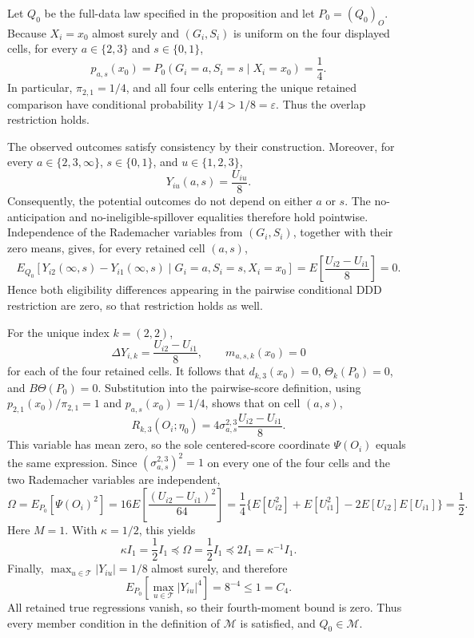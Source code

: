 Let \(Q_0\) be the full-data law specified in the proposition and let \(P_0=(Q_0)_O\).  Because \(X_i=x_0\) almost surely and \((G_i,S_i)\) is uniform on the four displayed cells, for every \(a\in\{2,3\}\) and \(s\in\{0,1\}\),
\[
p_{a,s}(x_0)=P_0(G_i=a,S_i=s\mid X_i=x_0)=\frac14.
\]
In particular, \(\pi_{2,1}=1/4\), and all four cells entering the unique retained comparison have conditional probability \(1/4>1/8=\varepsilon\).  Thus the overlap restriction holds.

The observed outcomes satisfy consistency by their construction.  Moreover, for every \(a\in\{2,3,\infty\}\), \(s\in\{0,1\}\), and \(u\in\{1,2,3\}\),
\[
Y_{iu}(a,s)=\frac{U_{iu}}8.
\]
Consequently, the potential outcomes do not depend on either \(a\) or \(s\).  The no-anticipation and no-ineligible-spillover equalities therefore hold pointwise.  Independence of the Rademacher variables from \((G_i,S_i)\), together with their zero means, gives, for every retained cell \((a,s)\),
\[
E_{Q_0}\!\left[Y_{i2}(\infty,s)-Y_{i1}(\infty,s)\mid G_i=a,S_i=s,X_i=x_0\right]
=E\!\left[\frac{U_{i2}-U_{i1}}8\right]=0.
\]
Hence both eligibility differences appearing in the pairwise conditional DDD restriction are zero, so that restriction holds as well.

For the unique index \(k=(2,2)\),
\[
\Delta Y_{i,k}=\frac{U_{i2}-U_{i1}}8,
\qquad
m_{a,s,k}(x_0)=0
\]
for each of the four retained cells.  It follows that \(d_{k,3}(x_0)=0\), \(\Theta_k(P_0)=0\), and \(B\Theta(P_0)=0\).  Substitution into the pairwise-score definition, using \(p_{2,1}(x_0)/\pi_{2,1}=1\) and \(p_{a,s}(x_0)=1/4\), shows that on cell \((a,s)\),
\[
R_{k,3}(O_i;\eta_0)
=4\sigma_{a,s}^{2,3}\frac{U_{i2}-U_{i1}}8.
\]
This variable has mean zero, so the sole centered-score coordinate \(\Psi(O_i)\) equals the same expression.  Since \((\sigma_{a,s}^{2,3})^2=1\) on every one of the four cells and the two Rademacher variables are independent,
\[
\Omega
=E_{P_0}[\Psi(O_i)^2]
=16E\!\left[\frac{(U_{i2}-U_{i1})^2}{64}\right]
=\frac14\{E[U_{i2}^2]+E[U_{i1}^2]-2E[U_{i2}]E[U_{i1}]\}
=\frac12.
\]
Here \(M=1\).  With \(\kappa=1/2\), this yields
\[
\kappa I_1=\frac12 I_1\preceq\Omega=\frac12 I_1\preceq 2I_1=\kappa^{-1}I_1.
\]
Finally, \(\max_{u\in\mathcal T}|Y_{iu}|=1/8\) almost surely, and therefore
\[
E_{P_0}\!\left[\max_{u\in\mathcal T}|Y_{iu}|^4\right]=8^{-4}\le 1=C_4.
\]
All retained true regressions vanish, so their fourth-moment bound is zero.  Thus every member condition in the definition of \(\mathcal M\) is satisfied, and \(Q_0\in\mathcal M\).
